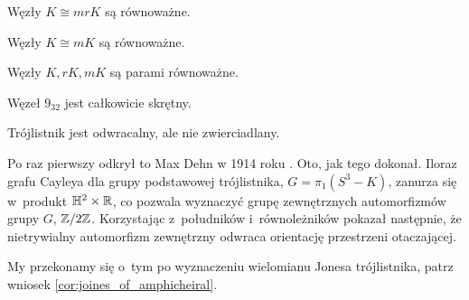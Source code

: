 \begin{definition}
    Węzły $K \cong mrK$ są równoważne. %
\end{definition}

\begin{definition}
    Węzły $K \cong mK$ są równoważne. %
\end{definition}

\begin{definition}
    Węzły $K, rK, mK$ są parami równoważne. %
\end{definition}

\begin{example}
    Węzeł $9_{32}$ jest całkowicie skrętny.
\end{example}


\begin{example}
    \label{exm:trefoil_is_chiral}
    Trójlistnik jest odwracalny, ale nie zwierciadlany.
\end{example}

Po raz pierwszy odkrył to Max Dehn w 1914 roku \cite{dehn14}.
Oto, jak tego dokonał.
Iloraz grafu Cayleya dla grupy podstawowej trójlistnika, $G = \pi_1(S^3 - K)$, zanurza się w~produkt $\mathbb H^2 \times \mathbb R$, co pozwala wyznaczyć grupę zewnętrznych automorfizmów grupy $G$, $\mathbb Z/2\mathbb Z$.
Korzystając z~południków i~równoleżników pokazał następnie, że nietrywialny automorfizm zewnętrzny odwraca orientację przestrzeni otaczającej.

My przekonamy się o~tym po wyznaczeniu wielomianu Jonesa trójlistnika, patrz wniosek \ref{cor:joines_of_amphicheiral}.

